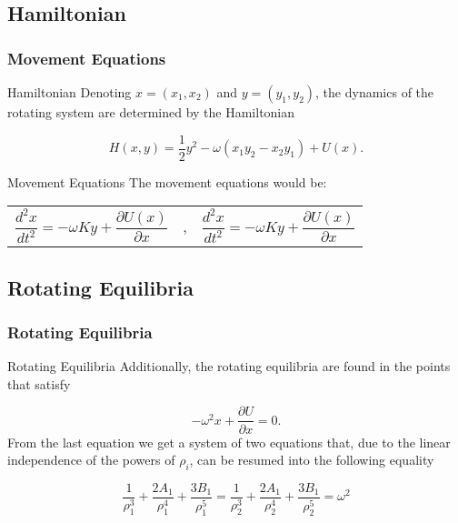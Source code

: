\documentclass{beamer}
\begin{document}
	\subsection{Hamiltonian}
	\begin{frame}
	\frametitle{Movement Equations}
	\begin{block}{Hamiltonian}
	Denoting $x=(x_1,x_2)$ and $y=(y_1,y_2)$, the dynamics of the rotating system are determined by the Hamiltonian
	
	
$$	H(x,y)=\frac{1}{2}y^2-\omega (x_1y_2-x_2y_1)+U(x).$$
	
	\end{block}
	
	\begin{block}{Movement Equations}
	The movement equations would be:
	\begin{center}
	\begin{tabular}{ccc}
$	\dfrac{d^2 x}{dt^2}=-\omega Ky+\dfrac{\partial U(x)}{\partial x}$
	
&,&	
$	\dfrac{d^2 x}{dt^2}=-\omega Ky+\dfrac{\partial U(x)}{\partial x}$
	\end{tabular}
	\end{center}
	\end{block}
	\end{frame}
	
	\subsection{Rotating Equilibria}
	\begin{frame}
	\frametitle{Rotating Equilibria}
	
	\begin{block}{Rotating Equilibria}
	Additionally, the rotating equilibria are found in the points that satisfy\cite{Meyer}
	
	\begin{equation}\label{rotatingEquilibria}
	-\omega^2 x+\dfrac{\partial U}{\partial x}=0.
	\end{equation}
	From the last equation we get a system of two equations that, due to the linear independence of the powers of $\rho_i$, can be resumed into the following equality
	
	\begin{equation}
	\frac{1}{\rho_1^3}+\frac{2A_1}{\rho_1^4}+\frac{3B_1}{\rho_1^5}=	\frac{1}{\rho_2^3}+\frac{2A_1}{\rho_2^4}+\frac{3B_1}{\rho_2^5}=\omega^2
	\end{equation}
	\end{block}
	\end{frame}
\end{document}
